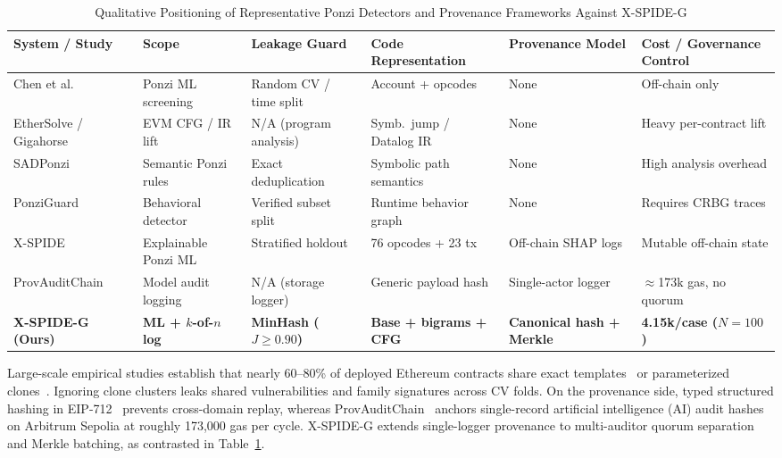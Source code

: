\documentclass[conference]{IEEEtran}
\begin{document}
\begin{table}[t]
\centering
\caption{Qualitative Positioning of Representative Ponzi Detectors and Provenance Frameworks Against X-SPIDE-G}
\label{tab:related_comparison}
\scriptsize
\setlength{\tabcolsep}{4pt}
\begin{tabular}{@{}llllll@{}}
\toprule
System / Study & Scope & Leakage Guard & Code Representation & Provenance Model & Cost / Governance Control \\
\midrule
Chen et al.~\cite{chen2018ponzi} & Ponzi ML screening & Random CV / time split & Account + opcodes & None & Off-chain only \\
EtherSolve / Gigahorse~\cite{contro2021ethersolve,grech2019gigahorse} & EVM CFG / IR lift & N/A (program analysis) & Symb.\ jump / Datalog IR & None & Heavy per-contract lift \\
SADPonzi~\cite{chen2021sadponzi} & Semantic Ponzi rules & Exact deduplication & Symbolic path semantics & None & High analysis overhead \\
PonziGuard~\cite{liang2024ponziguard,liang2025crbg} & Behavioral detector & Verified subset split & Runtime behavior graph & None & Requires CRBG traces \\
X-SPIDE~\cite{pennella2025xspide} & Explainable Ponzi ML & Stratified holdout & 76 opcodes + 23 tx & Off-chain SHAP logs & Mutable off-chain state \\
ProvAuditChain~\cite{akor2025provauditchain} & Model audit logging & N/A (storage logger) & Generic payload hash & Single-actor logger & $\approx$173k gas, no quorum \\
\textbf{X-SPIDE-G (Ours)} & \textbf{ML + $k$-of-$n$ log} & \textbf{MinHash ($J\ge 0.90$)} & \textbf{Base + bigrams + CFG} & \textbf{Canonical hash + Merkle} & \textbf{4.15k/case ($N=100$)} \\
\bottomrule
\end{tabular}
\end{table}

Large-scale empirical studies establish that nearly 60--80\% of deployed Ethereum contracts share exact templates~\cite{he2020clones} or parameterized clones~\cite{kondo2020cloning}. Ignoring clone clusters leaks shared vulnerabilities and family signatures across CV folds. On the provenance side, typed structured hashing in EIP-712~\cite{eip712} prevents cross-domain replay, whereas ProvAuditChain~\cite{akor2025provauditchain} anchors single-record artificial intelligence (AI) audit hashes on Arbitrum Sepolia at roughly 173,000 gas per cycle. X-SPIDE-G extends single-logger provenance to multi-auditor quorum separation and Merkle batching, as contrasted in Table~\ref{tab:related_comparison}.
\end{document}
